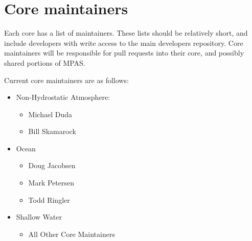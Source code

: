 \documentclass[11pt]{report}
\begin{document}
\chapter{Core maintainers}
Each core has a list of maintainers. These lists should be relatively short,
and include developers with write access to the main developers repository.
Core maintainers will be responsible for pull requests into their core, and
possibly shared portions of MPAS. 

Current core maintainers are as follows:
\begin{itemize}
	\item Non-Hydrostatic Atmosphere:
		\begin{itemize}
			\item Michael Duda
			\item Bill Skamarock
		\end{itemize}
	\item Ocean
		\begin{itemize}
			\item Doug Jacobsen
			\item Mark Petersen
			\item Todd Ringler
		\end{itemize}
	\item Shallow Water
		\begin{itemize}
			\item All Other Core Maintainers
		\end{itemize}
\end{itemize}
\end{document}
